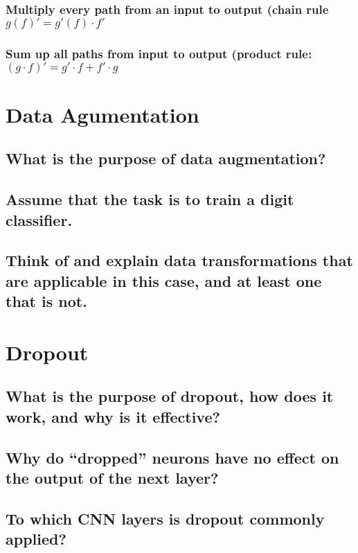 \subsubsection{ Multiply every path from an input to output (chain rule $g(f)' = g'(f)\cdot f'$}

\subsubsection{ Sum up all paths from input to output (product rule: $(g\cdot f)' = g'\cdot f + f'\cdot g$}
\section{Data Agumentation}

\subsection{What is the purpose of data augmentation?}

\subsection{Assume that the task is to train a digit classifier.}

\subsection{Think of and explain data transformations that are applicable in this case, and at least one that is not.}

\section{Dropout}

\subsection{What is the purpose of dropout, how does it work, and why is it effective?}

\subsection{Why do “dropped” neurons have no effect on the output of the next layer?}

\subsection{To which CNN layers is dropout commonly applied?}

